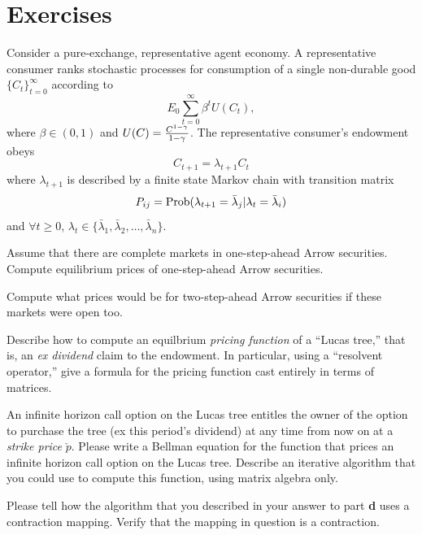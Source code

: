 \showchaptIDfalse
\showsectIDfalse
\section{Exercises}
\showchaptIDtrue
\showsectIDtrue
\medskip
{}  


\medskip


\noindent Consider a pure-exchange, representative agent economy.  A representative consumer ranks stochastic processes for consumption of a single non-durable
good $\{C_t\}_{t=0}^\infty$
according to
$$ E_0 \sum_{t=0}^\infty \beta^t U(C_t),$$
where $\beta \in (0,1)$ and $U(C) = {C^{1-\gamma}\over 1-\gamma}$.  The representative consumer's endowment
obeys
$$ C_{t+1} = \lambda_{t+1} C_t $$
where $\lambda_{t+1}$ is described by  a finite state Markov chain with transition matrix
$$ P_{ij} = {\rm Prob}( \lambda_{t+1} = \bar \lambda_j | \lambda_t = \bar \lambda_i) $$
and $ \forall t \geq 0$, $\lambda_t \in \{ \bar \lambda_1, \bar \lambda_2, \ldots, \bar \lambda_n \}$.

\medskip
{} Assume that there are complete markets in one-step-ahead Arrow securities.
 Compute  equilibrium prices of one-step-ahead Arrow securities.

\medskip
{}  Compute what prices would be for two-step-ahead Arrow securities if these markets were open too.

\medskip
{}  Describe how to compute an equilbrium {\it pricing function} of a ``Lucas tree,'' that is, an {\it ex dividend\/} claim to the endowment.
In particular, using a ``resolvent operator,'' give a formula for the pricing function cast entirely in terms of matrices.

\medskip
{}  An infinite horizon call option on the Lucas tree entitles the owner of the option to purchase the tree (ex this period's dividend) at any time from now on
at a {\it strike price\/} $\check p$.  Please write a Bellman equation for the function that prices  an infinite horizon call option on the Lucas tree.  Describe an iterative algorithm
that you could use to compute this function, using matrix algebra only.

\medskip
{} Please tell how  the algorithm that you described in your answer to part
{\bf d} uses a contraction mapping.  Verify that the   mapping in question is a contraction.

